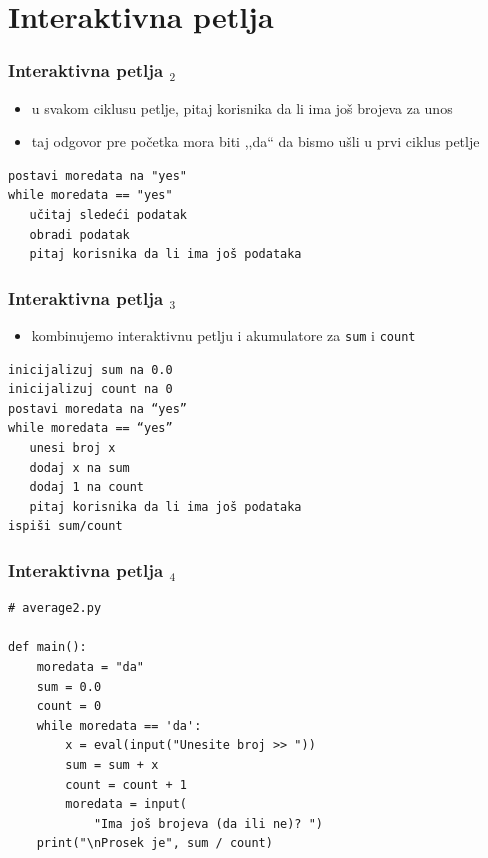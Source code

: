 \documentclass[utf8,compress]{beamer}
\begin{document}
\section{Interaktivna petlja}


\begin{frame}[fragile]
  \frametitle{Interaktivna petlja $_2$}
  \begin{itemize}
    \item u svakom ciklusu petlje, pitaj korisnika da li ima još brojeva za unos
    \item taj odgovor pre početka mora biti ,,da`` da bismo ušli u prvi ciklus petlje
  \end{itemize}
\begin{verbatim}
postavi moredata na "yes"
while moredata == "yes"
   učitaj sledeći podatak
   obradi podatak
   pitaj korisnika da li ima još podataka
\end{verbatim}
\end{frame}

\begin{frame}[fragile]
  \frametitle{Interaktivna petlja $_3$}
  \begin{itemize}
    \item kombinujemo interaktivnu petlju i akumulatore za \texttt{sum} i \texttt{count}
  \end{itemize}
\begin{verbatim}
inicijalizuj sum na 0.0
inicijalizuj count na 0
postavi moredata na “yes”
while moredata == “yes”
   unesi broj x
   dodaj x na sum
   dodaj 1 na count
   pitaj korisnika da li ima još podataka
ispiši sum/count
\end{verbatim}
\end{frame}

\begin{frame}[fragile]
  \frametitle{Interaktivna petlja $_4$}
\begin{verbatim}
# average2.py

def main():
    moredata = "da"
    sum = 0.0
    count = 0
    while moredata == 'da':
        x = eval(input("Unesite broj >> "))
        sum = sum + x
        count = count + 1
        moredata = input(
            "Ima još brojeva (da ili ne)? ")
    print("\nProsek je", sum / count)
\end{verbatim}
\end{frame}
\end{document}

